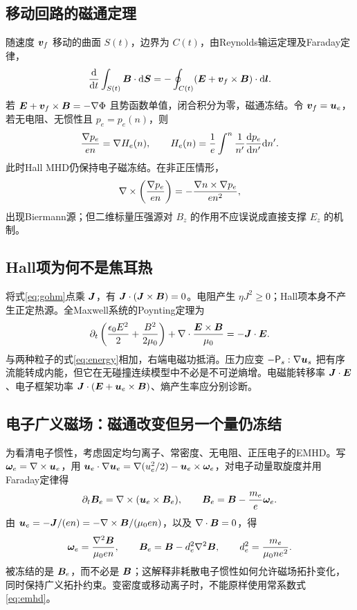 \documentclass[UTF8,a4paper,11pt,openany,fontset=fandol]{ctexbook}
\begin{document}
\subsection{移动回路的磁通定理}
随速度 $\bm{v}_f$ 移动的曲面 $S(t)$，边界为 $C(t)$，由Reynolds输运定理及Faraday定律，
\begin{equation}{\mathrm d\over\mathrm dt}\int_{S(t)}\bm{B}\cdot\mathrm d\bm{S}=-\oint_{C(t)}(\bm{E}+\bm{v}_f\times\bm{B})\cdot\mathrm d\bm{l}.\label{eq:flux}\end{equation}
若 $\bm{E}+\bm{v}_f\times\bm{B}=-\nabla\Phi$ 且势函数单值，闭合积分为零，磁通冻结。令 $\bm{v}_f=\bm{u}_e$，若无电阻、无惯性且 $p_e=p_e(n)$，则
\begin{equation}{\nabla p_e\over en}=\nabla H_e(n),\qquad H_e(n)={1\over e}\int^n{1\over n'}{\mathrm d p_e\over\mathrm d n'}\mathrm d n'.
\end{equation}
此时Hall MHD仍保持电子磁冻结。在非正压情形，
\begin{equation}\nabla\times\left({\nabla p_e\over en}\right)=-{\nabla n\times\nabla p_e\over en^2},
\end{equation}
出现Biermann源；但二维标量压强源对 $B_z$ 的作用不应误说成直接支撑 $E_z$ 的机制。

\subsection{Hall项为何不是焦耳热}
将式\eqref{eq:gohm}点乘 $\bm{J}$，有 $\bm{J}\cdot(\bm{J}\times\bm{B})=0$。电阻产生 $\eta J^2\ge0$；Hall项本身不产生正定热源。全Maxwell系统的Poynting定理为
\begin{equation}\partial_t\left({\epsilon_0E^2\over2}+{B^2\over2\mu_0}\right)+\nabla\cdot{\bm{E}\times\bm{B}\over\mu_0}=-\bm{J}\cdot\bm{E}.
\end{equation}
与两种粒子的式\eqref{eq:energy}相加，右端电磁功抵消。压力应变 $-\mathsf P_s:\nabla\bm{u}_s$ 把有序流能转成内能，但它在无碰撞连续模型中不必是不可逆熵增。电磁能转移率 $\bm{J}\cdot\bm{E}$、电子框架功率 $\bm{J}\cdot(\bm{E}+\bm{u}_e\times\bm{B})$、熵产生率应分别诊断。

\subsection{电子广义磁场：磁通改变但另一个量仍冻结}
为看清电子惯性，考虑固定均匀离子、常密度、无电阻、正压电子的EMHD。写 $\bm{\omega}_e=\nabla\times\bm{u}_e$，用
$\bm{u}_e\cdot\nabla\bm{u}_e=\nabla(u_e^2/2)-\bm{u}_e\times\bm{\omega}_e$，对电子动量取旋度并用Faraday定律得
\begin{equation}\partial_t\bm{B}_e=\nabla\times(\bm{u}_e\times\bm{B}_e),\qquad
\bm{B}_e=\bm{B}-{m_e\over e}\bm{\omega}_e.\label{eq:be}
\end{equation}
由 $\bm{u}_e=-\bm{J}/(en)=-\nabla\times\bm{B}/(\mu_0en)$，以及 $\nabla\cdot\bm{B}=0$，得
\begin{equation}\bm{\omega}_e={\nabla^2\bm{B}\over\mu_0en},\qquad
\bm{B}_e=\bm{B}-d_e^2\nabla^2\bm{B},\qquad d_e^2={m_e\over\mu_0ne^2}.\label{eq:emhd}
\end{equation}
被冻结的是 $\bm{B}_e$，而不必是 $\bm{B}$；这解释非耗散电子惯性如何允许磁场拓扑变化，同时保持广义拓扑约束。变密度或移动离子时，不能原样使用常系数式\eqref{eq:emhd}。
\end{document}
